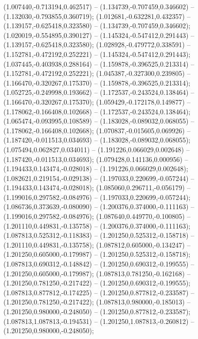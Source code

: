  (1.007440,-0.713194,0.462517) -- (1.134739,-0.707459,0.346602) -- (1.132030,-0.793855,0.360719);
 (1.012681,-0.632281,0.432357) -- (1.139157,-0.625418,0.323580) -- (1.134739,-0.707459,0.346602);
 (1.020019,-0.554895,0.390127) -- (1.145324,-0.547412,0.291443) -- (1.139157,-0.625418,0.323580);
 (1.028928,-0.479772,0.338591) -- (1.152781,-0.472192,0.252221) -- (1.145324,-0.547412,0.291443);
 (1.037445,-0.403938,0.288164) -- (1.159878,-0.396525,0.213314) -- (1.152781,-0.472192,0.252221);
 (1.045387,-0.327300,0.239805) -- (1.166470,-0.320267,0.175370) -- (1.159878,-0.396525,0.213314);
 (1.052725,-0.249998,0.193662) -- (1.172537,-0.243524,0.138464) -- (1.166470,-0.320267,0.175370);
 (1.059429,-0.172178,0.149877) -- (1.178062,-0.166408,0.102668) -- (1.172537,-0.243524,0.138464);
 (1.065474,-0.093995,0.108589) -- (1.183028,-0.089032,0.068055) -- (1.178062,-0.166408,0.102668);
 (1.070837,-0.015605,0.069926) -- (1.187420,-0.011513,0.034693) -- (1.183028,-0.089032,0.068055);
 (1.075494,0.062827,0.034011) -- (1.191226,0.066029,0.002648) -- (1.187420,-0.011513,0.034693);
 (1.079428,0.141136,0.000956) -- (1.194433,0.143474,-0.028018) -- (1.191226,0.066029,0.002648);
 (1.082621,0.219154,-0.029138) -- (1.197033,0.220699,-0.057244) -- (1.194433,0.143474,-0.028018);
 (1.085060,0.296711,-0.056179) -- (1.199016,0.297582,-0.084976) -- (1.197033,0.220699,-0.057244);
 (1.086736,0.373639,-0.080090) -- (1.200376,0.374000,-0.111163) -- (1.199016,0.297582,-0.084976);
 (1.087640,0.449770,-0.100805) -- (1.201110,0.449831,-0.135758) -- (1.200376,0.374000,-0.111163);
 (1.087813,0.525312,-0.118383) -- (1.201250,0.525312,-0.158718) -- (1.201110,0.449831,-0.135758);
 (1.087812,0.605000,-0.134247) -- (1.201250,0.605000,-0.179987) -- (1.201250,0.525312,-0.158718);
 (1.087813,0.690312,-0.148842) -- (1.201250,0.690312,-0.199555) -- (1.201250,0.605000,-0.179987);
 (1.087813,0.781250,-0.162168) -- (1.201250,0.781250,-0.217422) -- (1.201250,0.690312,-0.199555);
 (1.087813,0.877812,-0.174225) -- (1.201250,0.877812,-0.233587) -- (1.201250,0.781250,-0.217422);
 (1.087813,0.980000,-0.185013) -- (1.201250,0.980000,-0.248050) -- (1.201250,0.877812,-0.233587);
 (1.087813,1.087813,-0.194531) -- (1.201250,1.087813,-0.260812) -- (1.201250,0.980000,-0.248050);
